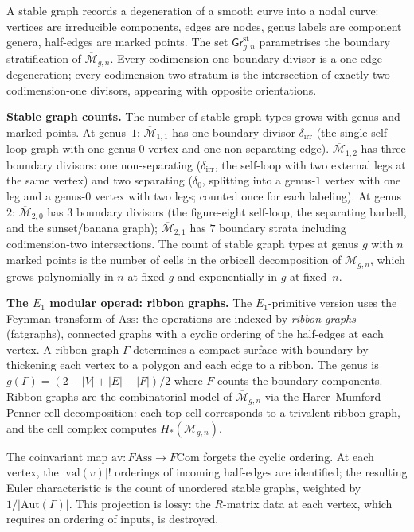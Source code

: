 \documentclass[11pt,reqno]{amsart}
\theoremstyle{definition}
\theoremstyle{remark}
\providecommand{\cM}{\mathcal{M}}
\providecommand{\Aut}{\mathrm{Aut}}
\providecommand{\Ass}{\mathrm{Ass}}
\providecommand{\Com}{\mathrm{Com}}
\numberwithin{equation}{section}
\begin{document}
A stable graph records a degeneration of a smooth curve into a nodal
curve: vertices are irreducible components, edges are nodes, genus
labels are component genera, half-edges are marked points. The set
$\mathsf{Gr}^{\mathrm{st}}_{g,n}$ parametrises the boundary
stratification of $\overline{\cM}_{g,n}$. Every codimension-one
boundary divisor is a one-edge degeneration; every codimension-two
stratum is the intersection of exactly two codimension-one divisors,
appearing with opposite orientations.

\medskip
\noindent\textbf{Stable graph counts.}\enspace
The number of stable graph types grows with genus and marked points.
At genus~$1$: $\overline{\cM}_{1,1}$ has one boundary divisor
$\delta_{\mathrm{irr}}$ (the single self-loop graph with one
genus-$0$ vertex and one non-separating edge).
$\overline{\cM}_{1,2}$ has three boundary divisors: one
non-separating ($\delta_{\mathrm{irr}}$, the self-loop with two
external legs at the same vertex) and two separating ($\delta_0$,
splitting into a genus-$1$ vertex with one leg and a genus-$0$
vertex with two legs; counted once for each labeling).
At genus~$2$:
$\overline{\cM}_{2,0}$ has $3$ boundary divisors (the figure-eight
self-loop, the separating barbell, and the sunset/banana graph);
$\overline{\cM}_{2,1}$ has $7$ boundary strata including codimension-two
intersections. The count of stable graph types at genus $g$ with $n$
marked points is the number of cells in the orbicell decomposition
of $\overline{\cM}_{g,n}$, which grows polynomially in $n$ at fixed
$g$ and exponentially in $g$ at fixed~$n$.

\medskip
\noindent\textbf{The $E_1$ modular operad: ribbon graphs.}\enspace
The $E_1$-primitive version uses the Feynman transform of $\Ass$:
the operations are indexed by \emph{ribbon graphs} (fatgraphs),
connected graphs with a cyclic ordering of the half-edges at each
vertex. A ribbon graph $\Gamma$ determines a compact surface with
boundary by thickening each vertex to a polygon and each edge to a
ribbon. The genus is $g(\Gamma)=(2-|V|+|E|-|F|)/2$ where $F$ counts
the boundary components. Ribbon graphs are the combinatorial model of
$\overline{\cM}_{g,n}$ via the Harer--Mumford--Penner cell
decomposition: each top cell corresponds to a trivalent ribbon graph,
and the cell complex computes $H_*(\cM_{g,n})$.

The coinvariant map $\mathrm{av}\colon F\!\Ass\to F\Com$ forgets the
cyclic ordering. At each vertex, the $|\mathrm{val}(v)|!$ orderings
of incoming half-edges are identified; the resulting Euler
characteristic is the count of unordered stable graphs, weighted by
$1/|\Aut(\Gamma)|$. This projection is lossy: the $R$-matrix
data at each vertex, which requires an ordering of inputs, is
destroyed.
\end{document}
